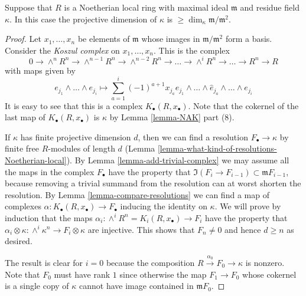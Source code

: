 \begin{lemma}
\label{lemma-length-resolution-residue-field}
Suppose that $R$ is a Noetherian local ring
with maximal ideal $\mathfrak m$ and
residue field $\kappa$. In this case
the projective dimension of $\kappa$ is
$\geq \dim_\kappa \mathfrak m / \mathfrak m^2$.
\end{lemma}

\begin{proof}
Let $x_1 , \ldots, x_n$ be elements of $\mathfrak m$
whose images in $\mathfrak m / \mathfrak m^2$ form a basis.
Consider the {\it Koszul complex} on $x_1, \ldots, x_n$.
This is the complex
$$
0 \to \wedge^n R^n \to \wedge^{n-1} R^n \to \wedge^{n-2} R^n \to
\ldots \to \wedge^i R^n \to \ldots \to R^n \to R
$$
with maps given by
$$
e_{j_1} \wedge \ldots \wedge e_{j_i}
\longmapsto
\sum_{a = 1}^i (-1)^{a + 1} x_{j_a} e_{j_1} \wedge \ldots
\wedge \hat e_{j_a} \wedge \ldots \wedge e_{j_i}
$$
It is easy to see that this is a complex $K_{\bullet}(R, x_{\bullet})$.
Note that the cokernel of the last map of $K_{\bullet}(R, x_{\bullet})$
is $\kappa$ by Lemma \ref{lemma-NAK} part (8).

\medskip\noindent
If $\kappa$ has finite projective dimension $d$, then we can find
a resolution $F_{\bullet} \to \kappa$ by finite free $R$-modules
of length $d$
(Lemma \ref{lemma-what-kind-of-resolutions-Noetherian-local}).
By Lemma \ref{lemma-add-trivial-complex}
we may assume all the maps in the complex $F_{\bullet}$
have the property that $\Im(F_i \to F_{i-1})
\subset \mathfrak m F_{i-1}$, because removing a trivial
summand from the resolution can at worst shorten the resolution.
By Lemma \ref{lemma-compare-resolutions} we can find a map
of complexes $\alpha : K_{\bullet}(R, x_{\bullet}) \to F_{\bullet}$
inducing the identity on $\kappa$. We will prove by induction
that the maps $\alpha_i : \wedge^i R^n = K_i(R, x_{\bullet}) \to F_i$
have the property that
$\alpha_i \otimes \kappa : \wedge^i \kappa^n \to F_i \otimes \kappa$
are injective. This shows that $F_n \not = 0$ and hence $d \geq n$
as desired.

\medskip\noindent
The result is clear for $i = 0$ because the composition
$R \xrightarrow{\alpha_0} F_0 \to \kappa$ is nonzero.
Note that $F_0$ must have rank $1$ since
otherwise the map $F_1 \to F_0$ whose cokernel is a single
copy of $\kappa$ cannot have image contained in $\mathfrak m F_0$.


\end{proof}
